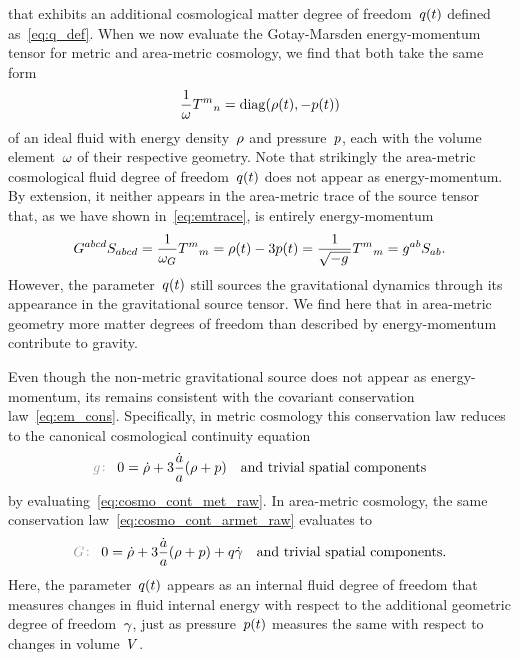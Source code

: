 that exhibits an additional cosmological matter degree of freedom~$q(t)$ defined as~\eqref{eq:q_def}. When we now evaluate the Gotay-Marsden energy-momentum tensor for metric and area-metric cosmology, we find that both take the same form
\begin{equation}\label{eq:emt_fluid}
	\frac{1}{\omega}{T^m}_n=\mathrm{diag}(\rho(t),-p(t))
\end{equation}
of an ideal fluid with energy density~$\rho$ and pressure~$p$, each with the volume element~$\omega$ of their respective geometry. Note that strikingly the area-metric cosmological fluid degree of freedom~$q(t)$ does not appear as energy-momentum. By extension, it neither appears in the area-metric trace of the source tensor that, as we have shown in~\eqref{eq:emtrace}, is entirely energy-momentum
\begin{equation}
	G^{abcd}S_{abcd}=\frac{1}{\omega_G}{T^m}_m=\rho(t)-3p(t)=\frac{1}{\sqrt{-g\,}}{T^m}_m=g^{ab}S_{ab}
	\mathpunct{.}
\end{equation}
However, the parameter~$q(t)$ still sources the gravitational dynamics through its appearance in the gravitational source tensor. We find here that in area-metric geometry more matter degrees of freedom than described by energy-momentum contribute to gravity.

Even though the non-metric gravitational source does not appear as energy-momentum, its remains consistent with the covariant conservation law~\eqref{eq:em_cons}. Specifically, in metric cosmology this conservation law reduces to the canonical cosmological continuity equation
\begin{equation}\label{eq:cosmo_cont_met}
	\metind 0=\dt{\dens}+3\frac{\dt{\scalea}}{\scalea}(\dens+\press) \quad \text{and trivial spatial components}
\end{equation}
by evaluating~\eqref{eq:cosmo_cont_met_raw}. In area-metric cosmology, the same conservation law~\eqref{eq:cosmo_cont_armet_raw} evaluates to
\begin{equation}\label{eq:cosmo_cont_armet}
	\armetind 0=\dt{\dens}+3\frac{\dt{\scalea}}{\scalea}(\dens+\press)+\q\dt{\lnc} \quad \text{and trivial spatial components.}
\end{equation}
Here, the parameter~$q(t)$ appears as an internal fluid degree of freedom that measures changes in fluid internal energy with respect to the additional geometric degree of freedom~$\gamma$, just as pressure~$p(t)$ measures the same with respect to changes in volume~$V$.

